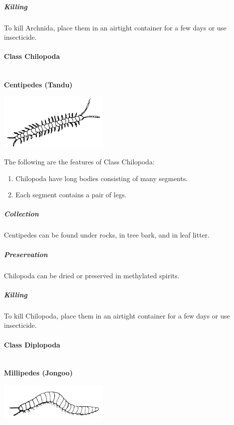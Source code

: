 \begin{multicols}{2}
\subparagraph{Killing}
To kill Archnida, place them in an airtight container for a few days or use insecticide.
		
\paragraph{Class Chilopoda}\hfill \\
\textbf{Centipedes (Tandu)}

\begin{center}
\includegraphics[width=0.4\textwidth]{./img/centipede.png}
\end{center}

The following are the features of Class Chilopoda:
\begin{enumerate}
\item{Chilopoda have long bodies consisting of many segments.}
\item{Each segment contains a pair of legs.}
\end{enumerate}

%

\subparagraph{Collection}
Centipedes can be found under rocks, in tree bark, and in leaf litter.

\subparagraph{Preservation} 
Chilopoda can be dried or preserved in methylated spirits.

\subparagraph{Killing}
To kill Chilopoda, place them in an airtight container for a few days or use insecticide.

\paragraph{Class Diplopoda} \hfill \\
\textbf{Millipedes (Jongoo)}

\begin{center}
\includegraphics[width=0.4\textwidth]{./img/millipede.png}
\end{center}


\end{multicols}
